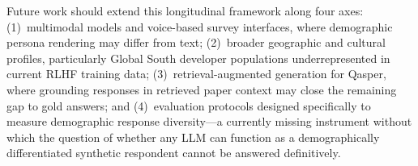 \documentclass[sigconf,nonacm]{acmart}
\begin{document}
Future work should extend this longitudinal framework along four axes:
(1)~multimodal models and voice-based survey interfaces, where demographic
persona rendering may differ from text;
(2)~broader geographic and cultural profiles, particularly Global South
developer populations underrepresented in current RLHF training data;
(3)~retrieval-augmented generation for Qasper, where grounding responses
in retrieved paper context may close the remaining gap to gold answers;
and (4)~evaluation protocols designed specifically to measure demographic
response diversity---a currently missing instrument without which the
question of whether any LLM can function as a demographically
differentiated synthetic respondent cannot be answered definitively.



\end{document}
